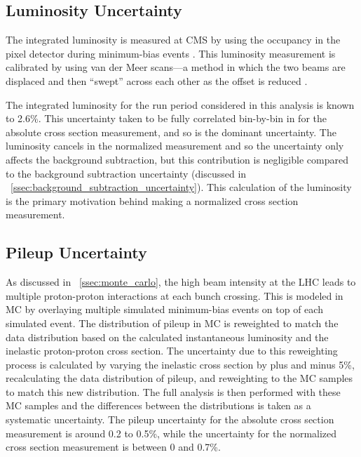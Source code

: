 \subsection{Luminosity Uncertainty}
\label{ssec:lumi_uncertainty}

The integrated luminosity is measured at CMS by using the occupancy in the
pixel detector during minimum-bias events \cite{cms_lumi_2013}. This luminosity
measurement is calibrated by using van der Meer scans---a method in which the
two beams are displaced and then ``swept'' across each other as the offset is
reduced \cite{vandermeer_1968}.

The integrated luminosity for the run period considered in this analysis is
known to 2.6\%. This uncertainty taken to be fully correlated bin-by-bin in
\phistar for the absolute cross section measurement, and so is the dominant
uncertainty. The luminosity cancels in the normalized measurement and so the
uncertainty only affects the background subtraction, but this contribution is
negligible compared to the background subtraction uncertainty (discussed in
\SEC~\ref{ssec:background_subtraction_uncertainty}). This calculation of the
luminosity is the primary motivation behind making a normalized cross section
measurement.

\subsection{Pileup Uncertainty}
\label{ssec:pileup_uncertainty}

As discussed in \SEC~\ref{ssec:monte_carlo}, the high beam intensity at the LHC
leads to multiple proton-proton interactions at each bunch crossing. This is
modeled in MC by overlaying multiple simulated minimum-bias events on top of
each simulated event. The distribution of pileup in MC is reweighted to match
the data distribution based on the calculated instantaneous luminosity and the
inelastic proton-proton cross section. The uncertainty due to this reweighting
process is calculated by varying the inelastic cross section by plus and minus
5\%, recalculating the data distribution of pileup, and reweighting to the MC
samples to match this new distribution. The full analysis is then performed
with these MC samples and the differences between the \phistar distributions is
taken as a systematic uncertainty. The pileup uncertainty for the absolute
cross section measurement is around 0.2 to 0.5\%, while the uncertainty for the
normalized cross section measurement is between 0 and 0.7\%.

